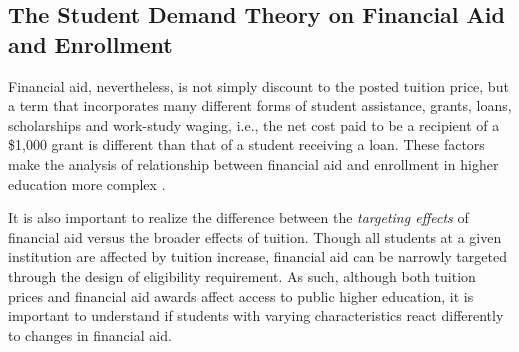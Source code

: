 \documentclass[12pt,english]{report}
\begin{document}
%


\subsection{The Student Demand Theory on Financial Aid and Enrollment}
Financial aid, nevertheless, is not simply discount to the posted tuition
price, but  a term that incorporates many different forms of student
assistance, grants, loans, scholarships and work-study waging, i.e.,
the net cost paid to be a recipient of a \$1,000 grant is different
than that of a student receiving a loan.  These factors make the 
analysis of relationship between financial aid and enrollment in
higher education more complex \citep{Heller1997}.

It is also important to realize the difference between the \textit{targeting
effects}  of financial aid versus the broader effects of tuition. Though all
students at a given institution are affected by tuition increase, financial aid
can be narrowly targeted through the design of eligibility requirement.  
As such, although both tuition prices and financial aid awards affect access to
public higher education, it is important to understand if students with varying
characteristics react differently to changes in financial aid.
\end{document}
